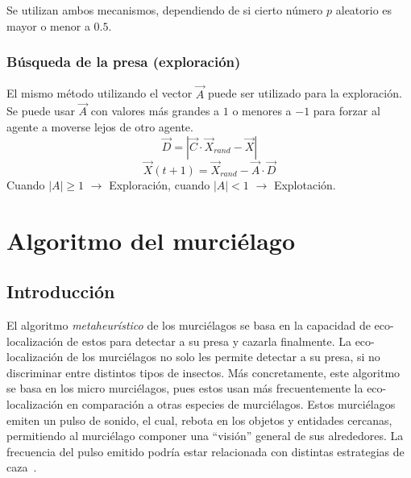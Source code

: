 Se utilizan ambos mecanismos, dependiendo de si cierto número $p$ aleatorio es mayor o menor a $0.5$.

\subsubsection{Búsqueda de la presa (exploración)}
El mismo método utilizando el vector $\vec{A}$ puede ser utilizado para la exploración. Se puede usar $\vec{A}$ con valores más grandes a $1$ o menores a $-1$ para forzar al agente a moverse lejos de otro agente.
\begin{equation}
    \vec{D}=|\vec{C}\cdot\vec{X}_{rand}-\vec{X}|
\end{equation}
\begin{equation}
    \vec{X}(t+1)=\vec{X}_{rand}-\vec{A}\cdot\vec{D}
\end{equation}
Cuando $|A|\geq 1$ $\rightarrow$ Exploración, cuando $|A|<1$ $\rightarrow$ Explotación.

\section{Algoritmo del murciélago}
\subsection{Introducción}
El algoritmo \textit{metaheurístico} de los murciélagos se basa en la capacidad de eco-localización de estos para detectar a su presa y cazarla finalmente. La eco-localización de los murciélagos no solo les permite detectar a su presa, si no discriminar entre distintos tipos de insectos. Más concretamente, este algoritmo se basa en los micro murciélagos, pues estos usan más frecuentemente la eco-localización en comparación a otras especies de murciélagos. Estos murciélagos emiten un pulso de sonido, el cual, rebota en los objetos y entidades cercanas, permitiendo al murciélago componer una ``visión'' general de sus alrededores. La frecuencia del pulso emitido podría estar relacionada con distintas estrategias de caza~\cite{yang_new_2010}.

